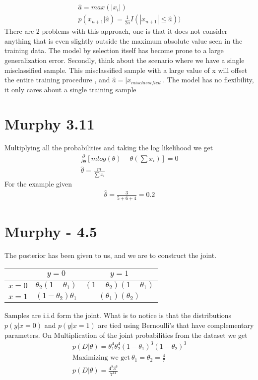 \begin{gather}
    \hat{a} = max (|x_i|) \\
    p(x_{n + 1} | \hat{a}) = \frac{1}{2\hat{a}} I(|x_{n+1}| \le \hat{a}))
\end{gather}  
There are 2 problems with this approach, one is that it does not consider anything that is even slightly outside the 
maximum absolute value seen in the training data. The model by selection itself has become prone
to a large generalization error.
Secondly, think about the scenario where we have a single misclassified sample. This misclassified sample with a large value of x
will offset the entire training procedure , and $\hat{a} = |x_{misclassified}|$. The model has no flexibility, it only cares about a single training sample

\section{Murphy 3.11}
Multiplying all the probabilities and taking the log likelihood we get 
\begin{gather}
    \frac{\partial }{\partial \theta}[ m log (\theta)  - \theta (\sum x_i)] = 0
    \\
    \hat{\theta} = \frac{m}{\sum x_i}
\end{gather}
For the example given 
\begin{gather}
    \hat{\theta} = \frac{3}{5 + 6 + 4} = 0.2
\end{gather}

\section{Murphy - 4.5}
The posterior has been given to us, and we are to construct the joint.
\begin{center}
\begin{tabular}{c|c|c}
      &  $y = 0$  & $y = 1$ \\
     \hline
     $x  = 0$ &  $\theta_2(1 - \theta_1)$ & $(1 - \theta_2)(1 - \theta_1)$ \\
     \hline
     $x = 1$ &  $(1 - \theta_2)\theta_1$ &  $(\theta_1)( \theta_2)$ \\
     \hline
\end{tabular}
\end{center}
Samples are i.i.d form the joint. What is to notice is that the distributions 
$p(y| x = 0)$ and $p(y | x = 1)$ are tied using Bernoulli's that have complementary parameters.
On Multiplication  of the joint probabilities from the dataset we get 
\begin{gather}
    p(D | \theta) = \theta_1^4 \theta_2^4 (1  -  \theta_1)^3  ( 1 - \theta_2)^3
    \\
    \text{Maximizing we get} \ \theta_1 = \theta_2 = \frac{4}{7}
    \\
    p(D | \theta) = \frac{4^8 3^6}{7^{14}}
\end{gather}

